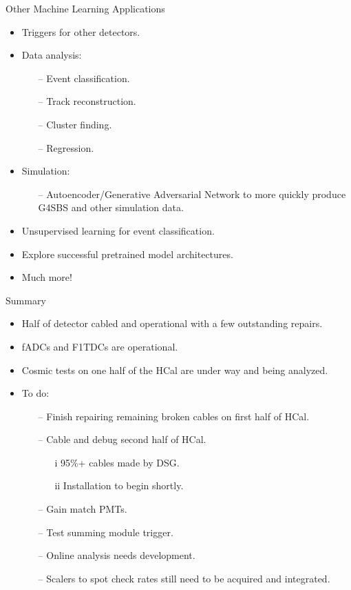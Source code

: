 \documentclass[10pt]{beamer}
\begin{document}
\begin{frame}{Other Machine Learning Applications}

	\begin{itemize}
		\item Triggers for other detectors.
		\item Data analysis:
			\begin{itemize}
				\item[--] Event classification.
				\item[--] Track reconstruction.
				\item[--] Cluster finding.
				\item[--] Regression.
			\end{itemize}
		\item Simulation:
			\begin{itemize}
				\item[--] Autoencoder/Generative Adversarial Network to more quickly produce G4SBS and other simulation data.
			\end{itemize}
		\item Unsupervised learning for event classification.
		\item Explore successful pretrained model architectures.
		\item Much more!
	\end{itemize}

\end{frame}

\begin{frame}{Summary}

	\begin{itemize}
		\item Half of detector cabled and operational with a few outstanding repairs.
		\item {}\alert{fADCs and F1TDCs are operational}.
		\item {}\alert{Cosmic tests} on one half of the HCal are under way and being analyzed.
		\item {}\alert{To do}:
		\begin{itemize}
			\item[--] Finish repairing remaining broken cables on first half of HCal.
			\item[--] Cable and debug second half of HCal.
				\begin{itemize}
					\item[i] 95\%+ cables made by DSG.
					\item[ii] Installation to begin shortly.
				\end{itemize}
			\item[--] Gain match PMTs.
			\item[--] Test summing module trigger.
			\item[--] Online analysis needs development.
			\item[--] Scalers to spot check rates still need to be acquired and integrated.
		\end{itemize}
	\end{itemize}

\end{frame}
\end{document}
